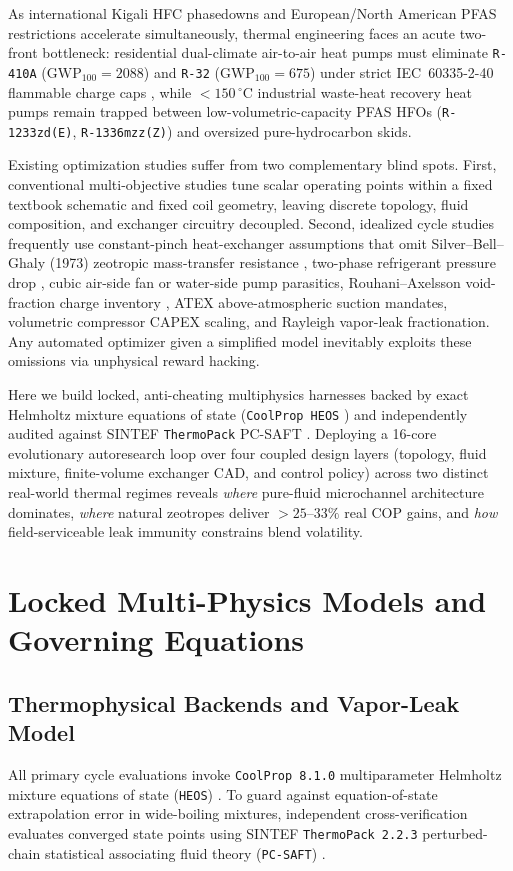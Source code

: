 \documentclass[twocolumn,10pt]{article}
\begin{document}
As international Kigali HFC phasedowns and European/North American PFAS restrictions accelerate simultaneously, thermal engineering faces an acute two-front bottleneck: residential dual-climate air-to-air heat pumps must eliminate \texttt{R-410A} ($\text{GWP}_{100}=2088$) and \texttt{R-32} ($\text{GWP}_{100}=675$) under strict IEC~60335-2-40 flammable charge caps \citep{iec60335_2_40}, while $<150\,^\circ\text{C}$ industrial waste-heat recovery heat pumps remain trapped between low-volumetric-capacity PFAS HFOs (\texttt{R-1233zd(E)}, \texttt{R-1336mzz(Z)}) and oversized pure-hydrocarbon skids.

Existing optimization studies suffer from two complementary blind spots. First, conventional multi-objective studies tune scalar operating points within a fixed textbook schematic and fixed coil geometry, leaving discrete topology, fluid composition, and exchanger circuitry decoupled. Second, idealized cycle studies frequently use constant-pinch heat-exchanger assumptions that omit Silver--Bell--Ghaly (1973) zeotropic mass-transfer resistance \citep{bell1973ghaly}, two-phase refrigerant pressure drop \citep{muller1986heck}, cubic air-side fan or water-side pump parasitics, Rouhani--Axelsson void-fraction charge inventory \citep{rouhani1970axelsson}, ATEX above-atmospheric suction mandates, volumetric compressor CAPEX scaling, and Rayleigh vapor-leak fractionation. Any automated optimizer given a simplified model inevitably exploits these omissions via unphysical reward hacking.

Here we build locked, anti-cheating multiphysics harnesses backed by exact Helmholtz mixture equations of state (\texttt{CoolProp HEOS} \citep{bell2014coolprop}) and independently audited against SINTEF \texttt{ThermoPack} PC-SAFT \citep{wilhelmsen2017thermopack}. Deploying a 16-core evolutionary autoresearch loop over four coupled design layers (topology, fluid mixture, finite-volume exchanger CAD, and control policy) across two distinct real-world thermal regimes reveals \emph{where} pure-fluid microchannel architecture dominates, \emph{where} natural zeotropes deliver $>25\text{--}33\%$ real COP gains, and \emph{how} field-serviceable leak immunity constrains blend volatility.

\section{Locked Multi-Physics Models and Governing Equations}

\subsection{Thermophysical Backends and Vapor-Leak Model}
All primary cycle evaluations invoke \texttt{CoolProp 8.1.0} multiparameter Helmholtz mixture equations of state (\texttt{HEOS}) \citep{bell2014coolprop}. To guard against equation-of-state extrapolation error in wide-boiling mixtures, independent cross-verification evaluates converged state points using SINTEF \texttt{ThermoPack 2.2.3} perturbed-chain statistical associating fluid theory (\texttt{PC-SAFT}) \citep{wilhelmsen2017thermopack}.
\end{document}
